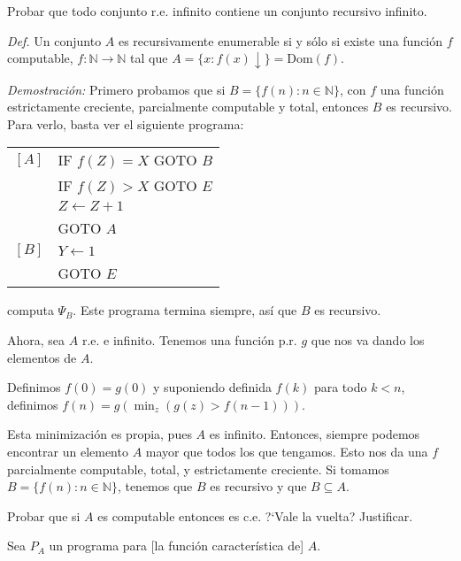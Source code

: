 \begin{questions}
\begin{solution}
\end{solution}

\question Probar que todo conjunto r.e. infinito contiene un conjunto recursivo infinito. 


\begin{solution}
 
 {\it Def. } Un conjunto $A$ es recursivamente enumerable si y s\'olo si existe una funci\'on $f$ computable, $f: \mathbb{N} \rightarrow \mathbb{N}$ tal que $A = \{x : f(x)\downarrow \} = \text{Dom}(f)$.
 
 {\it Demostraci\'on: } Primero probamos que si $B = \{ f(n) : n \in \mathbb{N} \}$, con $f$ una funci\'on estrictamente creciente, parcialmente computable y total, entonces $B$ es recursivo. Para verlo, basta ver el siguiente programa: 

 \vspace{0.5cm}
  \begin{tabular}{rl}
    $[A]$ & IF $f(Z)=X$ GOTO $B$ \\
	  & IF $f(Z)>X$ GOTO $E$ \\ 
	  & $Z\leftarrow Z+1$\\
	  & GOTO $A$\\
    $[B]$ & $Y\leftarrow 1$ \\
	  & GOTO $E$
  \end{tabular}
 \vspace{0.5cm}
 
 computa $\Psi_B$. Este programa termina siempre, as\'i que $B$ es recursivo. 
 
 Ahora, sea $A$ r.e. e infinito. Tenemos una funci\'on p.r. $g$ que nos va dando los elementos de $A$. 
 
 Definimos $f(0) = g(0)$ y suponiendo definida $f(k)$ para todo $k<n$, definimos $f(n) = g(\min_z(g(z)>f(n-1)))$.
 
 Esta minimizaci\'on es propia, pues $A$ es infinito. Entonces, siempre podemos encontrar un elemento $A$ mayor que todos los que tengamos. Esto nos da una $f$ parcialmente computable, total, y estrictamente creciente. Si tomamos $B=\{f(n) : n \in \mathbb{N}\}$, tenemos que $B$ es recursivo y que $B\subseteq A$. 
\end{solution}

\question Probar que si $A$ es computable entonces es c.e. ?`Vale la vuelta? Justificar.

\begin{solution}
 Sea $P_A$ un programa para [la funci\'on caracter\'istica de] $A$. 
 

\end{solution}
\end{questions}
